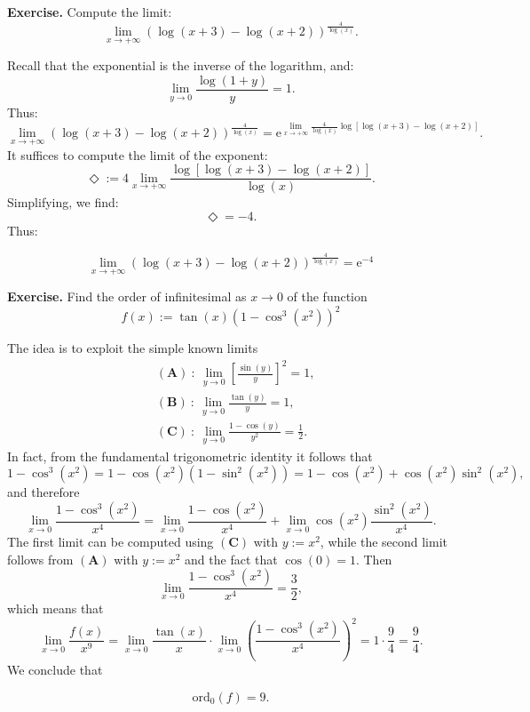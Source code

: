 \documentclass[a4paper,10 pt]{report}
\newcommand{\finalanswer}[1]{%
    \begin{finalAnswer}
    \[
        #1
    \]
    \end{finalAnswer}
}
\theoremstyle{definition}
\begin{document}
\begin{exerciseBox}
\textbf{Exercise.} Compute the limit:
\[
\lim_{x \to + \infty} \left( \log(x+3) - \log(x + 2) \right)^\frac{4}{\log(x)}.
\]
\end{exerciseBox}

\begin{solutionBox}
Recall that the exponential is the inverse of the logarithm, and:
\[
\lim_{y \to 0} \frac{\log(1 + y)}{y} = 1.
\]
Thus:
\[
\lim_{x \to + \infty} \left( \log(x+3) - \log(x + 2) \right)^\frac{4}{\log(x)} = \mathrm{e}^{\lim_{x \to + \infty} \frac{4}{\log(x)} \log \left[ \log(x+3) - \log(x + 2) \right]}.
\]
It suffices to compute the limit of the exponent:
\[
\Diamond := 4 \lim_{x \to + \infty} \frac{\log \left[ \log(x+3) - \log(x + 2) \right]}{\log(x)}.
\]
Simplifying, we find:
\[
\Diamond = -4.
\]
Thus:
\finalanswer{\lim_{x \to + \infty} \left( \log(x+3) - \log(x + 2) \right)^\frac{4}{\log(x)} = \mathrm{e}^{-4}}
\end{solutionBox}


\begin{exerciseBox}
\textbf{Exercise.} Find the order of infinitesimal as $x \to 0$ of the function
\[
f(x) := \tan(x) \left(1 - \cos^3(x^2) \right)^2
\]
\end{exerciseBox}

\begin{solutionBox} 
The idea is to exploit the simple known limits 
\[ \begin{aligned} & \mathbf{(A)} \: : \: \lim_{y \to 0} \left[ \frac{\sin(y)}{y} \right]^2 = 1,
\\[1em] &\mathbf{(B)} \: : \: \lim_{y \to 0} \frac{\tan(y)}{y} = 1,
\\[1em] &\mathbf{(C)} \: : \: \lim_{y \to 0} \frac{1 - \cos(y)}{y^2} = \frac{1}{2}. \end{aligned}
\]
In fact, from the fundamental trigonometric identity it follows that
\[
1 - \cos^3(x^2) = 1 - \cos(x^2)(1 - \sin^2(x^2)) = 1 - \cos(x^2) + \cos(x^2) \sin^2(x^2),
\]
and therefore
\[
\lim_{x \to 0} \frac{1 - \cos^3(x^2)}{x^4} = \lim_{x \to 0}  \frac{1 - \cos(x^2)}{x^4} + \lim_{x \to 0} \cos(x^2) \frac{\sin^2(x^2)}{x^4}.
\]
The first limit can be computed using $\mathbf{(C)}$ with $y := x^2$, while the second limit follows from $\mathbf{(A)}$ with $y := x^2$ and the fact that $\cos(0) = 1$. Then
\begin{equation*}\lim_{x \to 0} \frac{1 - \cos^3(x^2)}{x^4} = \frac{3}{2}, \end{equation*}
which means that
\begin{equation*}\lim_{x \to 0} \frac{f(x)}{x^9} =\lim_{x \to 0} \frac{\tan(x)}{x} \cdot \lim_{x \to 0} \left(\frac{1 - \cos^3(x^2)}{x^4} \right)^2 = 1 \cdot \frac{9}{4} = \frac{9}{4}.\end{equation*}
We conclude that
\finalanswer{\mathrm{ord}_0(f) = 9.}
\end{solutionBox}
\end{document}
